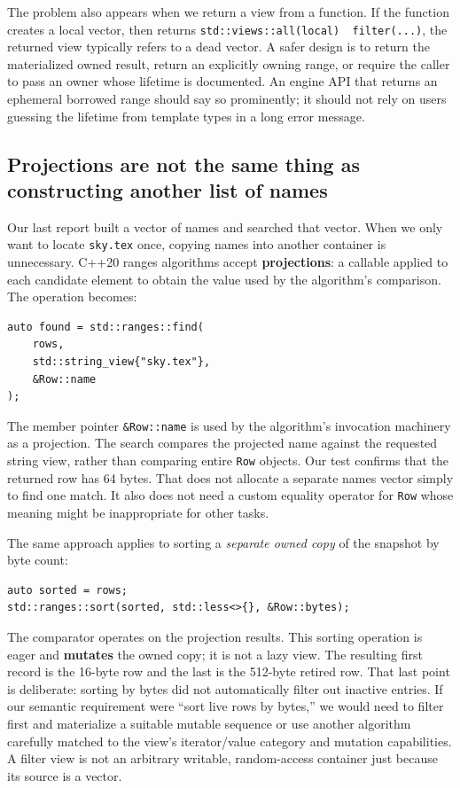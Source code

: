 The problem also appears when we return a view from a function. If the function creates a local vector, then returns \texttt{std::views::all(local)\ \textbar{}\ filter(...)}, the returned view typically refers to a dead vector. A safer design is to return the materialized owned result, return an explicitly owning range, or require the caller to pass an owner whose lifetime is documented. An engine API that returns an ephemeral borrowed range should say so prominently; it should not rely on users guessing the lifetime from template types in a long error message.

\subsection{Projections are not the same thing as constructing another list of names}\label{01-foundations-i-ch006-projections-are-not-the-same-thing-as-constructing-another-list-of-names}

Our last report built a vector of names and searched that vector. When we only want to locate \texttt{sky.tex} once, copying names into another container is unnecessary. C++20 ranges algorithms accept \textbf{projections}: a callable applied to each candidate element to obtain the value used by the algorithm's comparison. The operation becomes:

\begin{verbatim}
auto found = std::ranges::find(
    rows,
    std::string_view{"sky.tex"},
    &Row::name
);
\end{verbatim}

The member pointer \texttt{\&Row::name} is used by the algorithm's invocation machinery as a projection. The search compares the projected name against the requested string view, rather than comparing entire \texttt{Row} objects. Our test confirms that the returned row has 64 bytes. That does not allocate a separate names vector simply to find one match. It also does not need a custom equality operator for \texttt{Row} whose meaning might be inappropriate for other tasks.

The same approach applies to sorting a \emph{separate owned copy} of the snapshot by byte count:

\begin{verbatim}
auto sorted = rows;
std::ranges::sort(sorted, std::less<>{}, &Row::bytes);
\end{verbatim}

The comparator operates on the projection results. This sorting operation is eager and \textbf{mutates} the owned copy; it is not a lazy view. The resulting first record is the 16-byte row and the last is the 512-byte retired row. That last point is deliberate: sorting by bytes did not automatically filter out inactive entries. If our semantic requirement were ``sort live rows by bytes,'' we would need to filter first and materialize a suitable mutable sequence or use another algorithm carefully matched to the view's iterator/value category and mutation capabilities. A filter view is not an arbitrary writable, random-access container just because its source is a vector.

